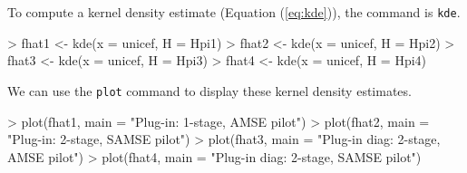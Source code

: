 \documentclass[a4paper,11pt]{article}
\begin{document}
To compute a kernel density estimate (Equation (\ref{eq:kde})), the 
command is \texttt{kde}.  
\begin{Schunk}
\begin{Sinput}
> fhat1 <- kde(x = unicef, H = Hpi1)
> fhat2 <- kde(x = unicef, H = Hpi2)
> fhat3 <- kde(x = unicef, H = Hpi3)
> fhat4 <- kde(x = unicef, H = Hpi4)
\end{Sinput}
\end{Schunk}
We can use the \texttt{plot} command to display these
kernel density estimates. %
\begin{Schunk}
\begin{Sinput}
> plot(fhat1, main = "Plug-in: 1-stage, AMSE pilot")
> plot(fhat2, main = "Plug-in: 2-stage, SAMSE pilot")
> plot(fhat3, main = "Plug-in diag: 2-stage, AMSE pilot")
> plot(fhat4, main = "Plug-in diag: 2-stage, SAMSE pilot")
\end{Sinput}
\end{Schunk}
\end{document}
